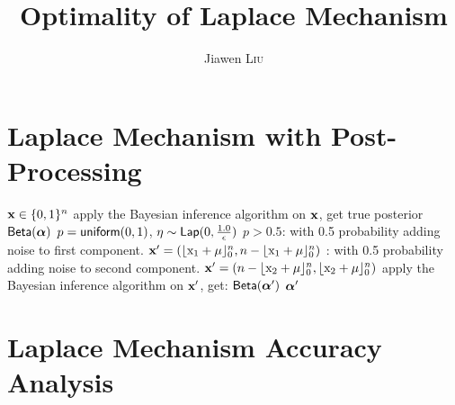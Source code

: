 \documentclass{article}
\begin{document}
\title{Optimality of Laplace Mechanism}

\author{Jiawen \textsc{Liu}} %

\maketitle

\section{Laplace Mechanism with Post-Processing}

\begin{algorithm}
  \caption{$\lapmech$}
  \label{lapmech}
  \begin{algorithmic}
  	\REQUIRE $\textbf{x} \in \{0 ,1 \}^n$
	\STATE \quad apply the Bayesian inference algorithm on $\textbf{x}$, get true posterior $\mathsf{Beta}(\boldsymbol{\alpha})$
  	\STATE {} $p = \mathsf{uniform}(0, 1)$, $\eta \sim \mathsf{Lap}(0, \frac{1.0}{\epsilon})$
  	\STATE {} $p >0.5$: 
  	\STATE \quad \quad with 0.5 probability adding noise to first component.
  	\STATE \quad \quad  $\textbf{x}' = (\lfloor \text{x}_1 + \mu \rfloor_0^n, n - \lfloor \text{x}_1 + \mu \rfloor_0^n)$ 
  	\STATE {}: 
  	\STATE \quad \quad with 0.5 probability adding noise to second component.
  	\STATE \quad \quad  $\textbf{x}' = (n - \lfloor \text{x}_2 + \mu \rfloor_0^n, \lfloor \text{x}_2 + \mu \rfloor_0^n)$ 
	\STATE \quad apply the Bayesian inference algorithm on $\textbf{x}'$, get: $\mathsf{Beta}(\boldsymbol{\alpha}')$
	\RETURN $\boldsymbol{\alpha}'$
  \end{algorithmic}
\end{algorithm}



\clearpage
\section{Laplace Mechanism Accuracy Analysis}
\label{sec_fullacc}
\end{document}
